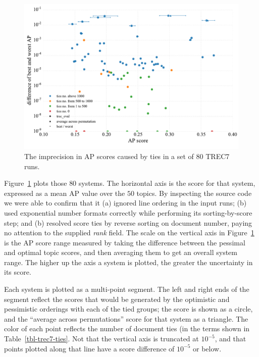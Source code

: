 \begin{figure}[t!]
\centering
\includegraphics[width=1\textwidth]{figs/fig-trec7-ap-scores.pdf}
\caption{The imprecision in AP scores caused by ties in a set of $80$
TREC7 runs.
\label{fig-trec7-ap-scores}}
\end{figure}

Figure~\ref{fig-trec7-ap-scores} plots those $80$ systems.
The horizontal axis is the {\treceval} score for that system,
expressed as a mean AP value over the $50$ topics.
By inspecting the {\treceval} source code we were able to confirm
that it (a) ignored line ordering in the input runs; (b) used
exponential number formats correctly while performing its
sorting-by-score step; and (b) resolved score ties by reverse sorting
on document number, paying no attention to the supplied {\emph{rank}}
field.
The scale on the vertical axis in Figure~\ref{fig-trec7-ap-scores} is
the AP score range measured by taking the difference between the
pessimal and optimal topic scores, and then averaging them to get an
overall system range.
The higher up the axis a system is plotted, the greater the
uncertainty in its score.

Each system is plotted as a multi-point segment.
The left and right ends of the segment reflect the scores that would
be generated by the optimistic and pessimistic orderings with each of
the tied groups; the {\treceval} score is shown as a circle, and the
``average across permutations'' score for that system as a triangle.
The color of each point reflects the number of document ties (in the
terms shown in Table~\ref{tbl-trec7-ties}.
Not that the vertical axis is truncated at $10^{-5}$, and that points
plotted along that line have a score difference of $10^{-5}$ or
below.
{}



{}
{}
